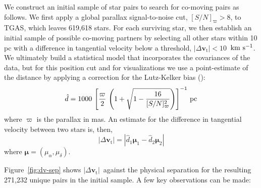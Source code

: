 \documentclass[manuscript, letterpaper]{aastex6}
\newcommand{\acronym}[1]{{\small{#1}}}
\newcommand{\tgas}{\acronym{TGAS}}
\newcommand{\bs}[1]{\boldsymbol{#1}}
\renewcommand{\vec}[1]{\bs{#1}}
\newcommand{\kms}{\ensuremath{\rm km~s^{-1}}}
\newcommand{\snr}{[S/N]_\varpi}
\newcommand{\absdvtan}{\ensuremath{|\Delta\vec v_\mathrm{t}|}}
\begin{document}
We construct an initial sample of star pairs to search for co-moving pairs as
follows.
We first apply a global parallax signal-to-noise cut, $\snr > 8$,  to \tgas,
which leaves 619,618 stars.
For each surviving star, we then establish an initial sample of possible
co-moving partners by selecting all other stars within 10 pc with a difference
in tangential velocity below a threshold, $\absdvtan < 10$~\kms.
We ultimately build a statistical model that incorporates the covariances of the
data, but for this position cut and for visualizations we use a point-estimate
of the distance by applying a correction for the Lutz-Kelker bias
(\citealt{Lutz:1973aa}):
\begin{equation}
  \hat{d} = 1000 \, \left[\frac{\varpi}{2} \,
    \left(1 + \sqrt{1 - \frac{16}{\snr^2}} \right) \right]^{-1} \, {\rm pc}
    \label{eq:dist}
\end{equation}
where $\varpi$ is the parallax in mas.
An estimate for the difference in tangential velocity between two stars is,
then,
\begin{equation}
  \absdvtan = |\hat{d}_1 \vec\mu_1 - \hat{d}_2 \vec\mu_2|
\end{equation}
where $\vec\mu = (\mu_\alpha, \mu_\delta)$.

Figure~\ref{fig:dv-sep} shows \absdvtan\ against the physical separation
for the resulting 271,232 unique pairs in the initial sample.
A few key observations can be made:
\end{document}
